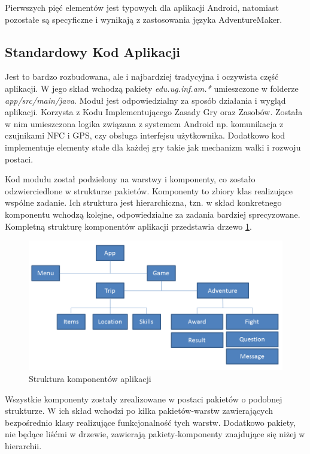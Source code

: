 \documentclass[openright]{xmgr}
\begin{document}
Pierwszych pięć elementów jest typowych dla aplikacji Android, natomiast pozostałe są specyficzne i wynikają z zastosowania języka AdventureMaker.

\subsection*{Standardowy Kod Aplikacji} 

Jest to bardzo rozbudowana, ale i najbardziej tradycyjna i oczywista część aplikacji. W jego skład wchodzą pakiety \textit{edu.ug.inf.am.*} umieszczone w folderze \textit{app/src/main/java}. Moduł jest odpowiedzialny za sposób działania i wygląd aplikacji. Korzysta z Kodu Implementującego Zasady Gry oraz Zasobów. Została w nim umieszczona logika związana z systemem Android np. komunikacja z czujnikami NFC i GPS, czy obsługa interfejsu użytkownika. Dodatkowo kod implementuje elementy stałe dla każdej gry takie jak mechanizm walki i rozwoju postaci.

Kod modułu został podzielony na warstwy i komponenty, co zostało odzwierciedlone w strukturze pakietów. 
Komponenty to zbiory klas realizujące wspólne zadanie. Ich struktura jest hierarchiczna, tzn. w skład konkretnego komponentu wchodzą kolejne, odpowiedzialne za zadania bardziej sprecyzowane. Kompletną strukturę komponentów aplikacji przedstawia drzewo \ref{modules:tree}.

\begin{figure}[!tbh]
	\centering
	\includegraphics[width=1.0\hsize]{fig/modules_tree}
	\caption{Struktura komponentów aplikacji}
	\label{modules:tree}
\end{figure}

Wszystkie komponenty zostały zrealizowane w postaci pakietów o podobnej strukturze. W ich skład wchodzi po kilka pakietów-warstw zawierających bezpośrednio klasy realizujące funkcjonalność tych warstw. Dodatkowo pakiety, nie będące liśćmi w drzewie, zawierają pakiety-komponenty znajdujące się niżej w hierarchii.
\end{document}
